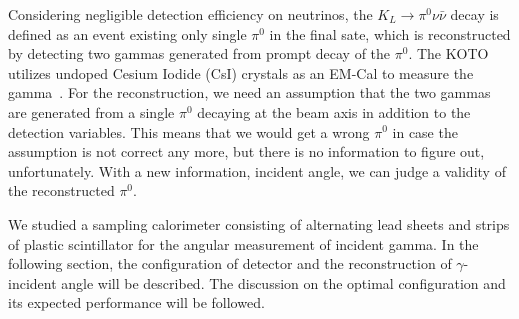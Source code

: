 \documentclass[jkps,preprint,fleqn,showpacs,showkeys]{revtex4}
\begin{document}
Considering negligible detection efficiency on neutrinos, the $K_L \rightarrow \pi^0 \nu \bar{\nu}$ decay is defined as an event existing only single $\pi^0$ in the final sate, which is reconstructed by detecting two gammas generated from prompt decay of the $\pi^0$. The KOTO utilizes undoped Cesium Iodide (CsI) crystals as an EM-Cal to measure the gamma~\cite{CsI}. %
For the reconstruction, we need an assumption that the two gammas are generated from a single $\pi^0$ decaying at the beam axis in addition to the detection variables. This means that we would get a wrong $\pi^0$ in case the assumption is not correct any more, but there is no information to figure out, unfortunately. With a new information, incident angle, we can judge a validity of the reconstructed $\pi^0$.

We studied a sampling calorimeter consisting of alternating lead sheets and strips of plastic scintillator for the angular measurement of incident gamma. %
In the following section, the configuration of detector and the reconstruction of $\gamma$-incident angle will be described. The discussion on the optimal configuration and its expected performance will be followed.
\end{document}
